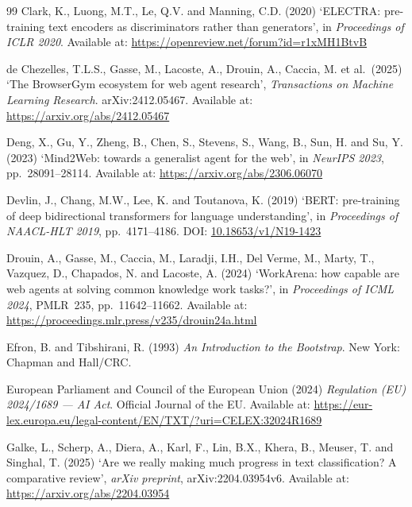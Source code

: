 \documentclass[12pt,a4paper]{article}
\begin{document}
\begin{thebibliography}{99}
Clark, K., Luong, M.T., Le, Q.V. and Manning, C.D. (2020)
`ELECTRA: pre-training text encoders as discriminators rather than generators',
in \textit{Proceedings of ICLR 2020}.
Available at: \url{https://openreview.net/forum?id=r1xMH1BtvB}

de Chezelles, T.L.S., Gasse, M., Lacoste, A., Drouin, A., Caccia, M. et al.\ (2025)
`The BrowserGym ecosystem for web agent research',
\textit{Transactions on Machine Learning Research}. arXiv:2412.05467.
Available at: \url{https://arxiv.org/abs/2412.05467}

Deng, X., Gu, Y., Zheng, B., Chen, S., Stevens, S., Wang, B., Sun, H. and
Su, Y. (2023)
`Mind2Web: towards a generalist agent for the web',
in \textit{NeurIPS 2023}, pp.~28091--28114.
Available at: \url{https://arxiv.org/abs/2306.06070}

Devlin, J., Chang, M.W., Lee, K. and Toutanova, K. (2019)
`BERT: pre-training of deep bidirectional transformers for language understanding',
in \textit{Proceedings of NAACL-HLT 2019}, pp.~4171--4186.
DOI: \href{https://doi.org/10.18653/v1/N19-1423}{10.18653/v1/N19-1423}

Drouin, A., Gasse, M., Caccia, M., Laradji, I.H., Del Verme, M., Marty, T.,
Vazquez, D., Chapados, N. and Lacoste, A. (2024)
`WorkArena: how capable are web agents at solving common knowledge work tasks?',
in \textit{Proceedings of ICML 2024}, PMLR~235, pp.~11642--11662.
Available at: \url{https://proceedings.mlr.press/v235/drouin24a.html}

Efron, B. and Tibshirani, R. (1993)
\textit{An Introduction to the Bootstrap}. New York: Chapman and Hall/CRC.

European Parliament and Council of the European Union (2024)
\textit{Regulation (EU) 2024/1689 --- AI Act}. Official Journal of the EU.
Available at: \url{https://eur-lex.europa.eu/legal-content/EN/TXT/?uri=CELEX:32024R1689}

Galke, L., Scherp, A., Diera, A., Karl, F., Lin, B.X., Khera, B.,
Meuser, T. and Singhal, T. (2025)
`Are we really making much progress in text classification? A comparative review',
\textit{arXiv preprint}, arXiv:2204.03954v6.
Available at: \url{https://arxiv.org/abs/2204.03954}


\end{thebibliography}
\end{document}
